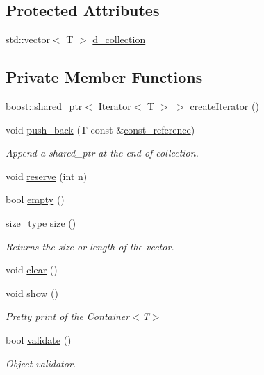 \subsection*{Protected Attributes}
\begin{DoxyCompactItemize}
\item 
std::vector$<$ T $>$ \hyperlink{class_simple_container_a0be5592282fc09b51a344d4083a7daf9}{d\_\-collection}
\end{DoxyCompactItemize}
\subsection*{Private Member Functions}
\begin{DoxyCompactItemize}
\item 
boost::shared\_\-ptr$<$ \hyperlink{class_iterator}{Iterator}$<$ T $>$ $>$ \hyperlink{class_simple_container_a4e46f5cb32231deaf9aa9bb7f871d09e}{createIterator} ()
\item 
void \hyperlink{class_simple_container_a53466966297b3f0a707e025b3721004a}{push\_\-back} (T const \&\hyperlink{class_container_a8dd7ae9d0687e11d873f98206e961ac1}{const\_\-reference})
\begin{DoxyCompactList}\small\item\em Append a shared\_\-ptr at the end of collection. \end{DoxyCompactList}\item 
void \hyperlink{class_simple_container_a4bca44e6a9cef9d57627218c0a180d8a}{reserve} (int n)
\item 
bool \hyperlink{class_simple_container_ac2966f33796f69c290a84361a578ed08}{empty} ()
\item 
size\_\-type \hyperlink{class_simple_container_a2fdb3580e1728e6e2ba6ef77c0bce63e}{size} ()
\begin{DoxyCompactList}\small\item\em Returns the size or length of the vector. \end{DoxyCompactList}\item 
void \hyperlink{class_simple_container_ae3ee6cb18f1dd33ab5de4f9854ce245f}{clear} ()
\item 
void \hyperlink{class_simple_container_af4d591e2c3a44ae016e01e3d07d1e9ac}{show} ()
\begin{DoxyCompactList}\small\item\em Pretty print of the Container$<$T$>$ \end{DoxyCompactList}\item 
bool \hyperlink{class_simple_container_ac7cae8eaac2dc0a69138b65f679bd16a}{validate} ()
\begin{DoxyCompactList}\small\item\em Object validator. \end{DoxyCompactList}\end{DoxyCompactItemize}
